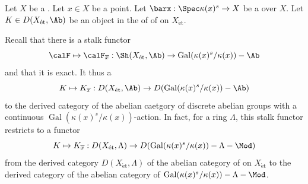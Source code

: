 \begin{definition} \label{definition:geometric_stalk_of_the_derived_category_of_the_category_of_etale_sheaves_of_abelian_groups_on_a_scheme}
        Let $X$ be a . Let $x \in X$ be a point. Let $\barx: \Spec \kappa(x)^s \to X$ be a  over $X$.
        Let $K \in D(X_{\mathrm{\acute{e}t}}, \Ab)$ be an object in the  of  of  on $X_{\mathrm{\acute{e}t}}$. 

        Recall that there is a stalk functor 
        $$\calF \mapsto \calF_{\overline{x}}: \Sh(X_{\text{ét}}, \Ab) \to \operatorname{Gal}(\kappa(x)^s / \kappa(x))-\Ab$$
        and that it is exact. It thus  a 
        $$K \mapsto K_{\overline{x}}: D(X_{\mathrm{\acute{e}t}}, \Ab) \to D(\operatorname{Gal}(\kappa(x)^s / \kappa(x))-\Ab)$$
        to the derived category of the abelian caetgory of discrete abelian groups with a continuous $\operatorname{Gal}(\kappa(x)^s / \kappa(x))$-action. In fact, for a ring $\Lambda$, this stalk functor restricts to a functor
        $$K \mapsto K_{\overline{x}}: D(X_{\mathrm{\acute{e}t}}, \Lambda) \to D(\operatorname{Gal}(\kappa(x)^s / \kappa(x))-\Lambda-\Mod)$$
        from the derived category $D(X_{\mathrm{\acute{e}t}}, \Lambda)$ of the abelian category of  on $X_{\mathrm{\acute{e}t}}$ to the derived category of the abelian category of $\operatorname{Gal}(\kappa(x)^s / \kappa(x))-\Lambda-\Mod$. 
\end{definition}